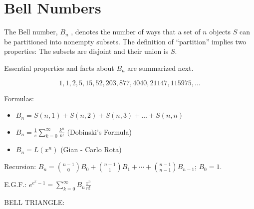 \documentclass[10pt,]{book}
\theoremstyle{plain}
\theoremstyle{definition}
\theoremstyle{definition}
\numberwithin{equation}{chapter}
\newlength{\panelmax}
\begin{document}
\chapter[{Bell Numbers}]{Bell Numbers}\label{ch_temp}
\hypertarget{p-147}{}%
The Bell number, \(B_{n}\) , denotes the number of ways that a set of \(n\) objects \(S\) can be partitioned into nonempty subsets. The definition of ``partition'' implies two properties: The subsets are disjoint and their union is \(S\).%
\par
\hypertarget{p-148}{}%
Essential properties and facts about \(B_{n}\) are summarized next.%
\begin{assemblage}\label{assemblage-1}
\hypertarget{p-149}{}%
%
\begin{equation*}
1, 1, 2, 5, 15, 52, 203, 877, 4040, 21147, 115975, \ldots
\end{equation*}
%
\par
\hypertarget{p-150}{}%
Formulas: %
\begin{itemize}[label=\textbullet]
\item{}\(B_{n} = S\left( n,1 \right) + S\left( n,2 \right) + S\left( n,3 \right) + \ldots + S(n,n)\)%
\item{}\(B_{n} = \frac{1}{e}\sum_{k=0}^{\infty}\frac{k^{n}}{k!}\) (Dobinski's Formula)%
\item{}\(B_{n} = L\left( x^{n} \right)\) (Gian - Carlo Rota)%
\end{itemize}
%
\par
\hypertarget{p-151}{}%
Recursion: \(B_{n} = \binom{n - 1}{0}B_{0} + \binom{n - 1}{1}B_{1} + \cdots + \binom{n - 1}{n - 1}B_{n - 1}\); \(B_{0} = 1\).%
\par
\hypertarget{p-152}{}%
E.G.F.: \(e^{e^{x} - 1} = \sum_{k = 0}^{\infty}{B_{n}\frac{x^{n}}{n!}}\)%
\par
\hypertarget{p-153}{}%
BELL TRIANGLE:%
{%
\setlength{\panelmax}{0pt}
\ifdefined\panelboxAtabular\else\newsavebox{\panelboxAtabular}\fi%
\ifdefined\phAtabular\else\newlength{\phAtabular}\fi%
\setlength{\phAtabular}{\ht\panelboxAtabular+\dp\panelboxAtabular}
}
\end{assemblage}
\end{document}
